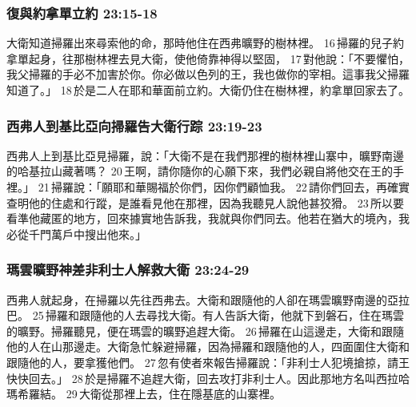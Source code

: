 \subsubsection{復與約拿單立約 23:15-18}
大衛知道掃羅出來尋索他的命，那時他住在西弗曠野的樹林裡。 16 掃羅的兒子約拿單起身，往那樹林裡去見大衛，使他倚靠神得以堅固， 17 對他說：「不要懼怕，我父掃羅的手必不加害於你。你必做以色列的王，我也做你的宰相。這事我父掃羅知道了。」 18 於是二人在耶和華面前立約。大衛仍住在樹林裡，約拿單回家去了。

\subsubsection{西弗人到基比亞向掃羅告大衛行踪 23:19-23}
西弗人上到基比亞見掃羅，說：「大衛不是在我們那裡的樹林裡山寨中，曠野南邊的哈基拉山藏著嗎？ 20 王啊，請你隨你的心願下來，我們必親自將他交在王的手裡。」 21 掃羅說：「願耶和華賜福於你們，因你們顧恤我。 22 請你們回去，再確實查明他的住處和行蹤，是誰看見他在那裡，因為我聽見人說他甚狡猾。 23 所以要看準他藏匿的地方，回來據實地告訴我，我就與你們同去。他若在猶大的境內，我必從千門萬戶中搜出他來。」

\subsubsection{瑪雲曠野神差非利士人解救大衛 23:24-29}
西弗人就起身，在掃羅以先往西弗去。大衛和跟隨他的人卻在瑪雲曠野南邊的亞拉巴。 25 掃羅和跟隨他的人去尋找大衛。有人告訴大衛，他就下到磐石，住在瑪雲的曠野。掃羅聽見，便在瑪雲的曠野追趕大衛。 26 掃羅在山這邊走，大衛和跟隨他的人在山那邊走。大衛急忙躲避掃羅，因為掃羅和跟隨他的人，四面圍住大衛和跟隨他的人，要拿獲他們。 27 忽有使者來報告掃羅說：「非利士人犯境搶掠，請王快快回去。」 28 於是掃羅不追趕大衛，回去攻打非利士人。因此那地方名叫西拉哈瑪希羅結。 29 大衛從那裡上去，住在隱基底的山寨裡。

